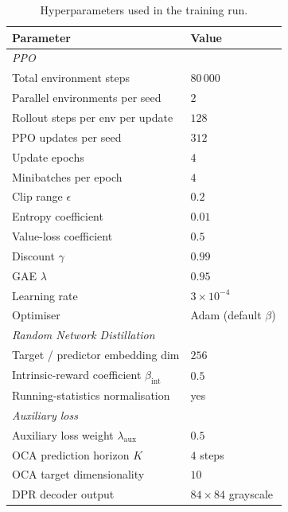 \documentclass{article}
\begin{document}
\begin{table}[h]
  \caption{Hyperparameters used in the training run.}
  \label{tab:hparams}
  \centering
  \small
  \begin{tabular}{ll}
    \toprule
    \textbf{Parameter} & \textbf{Value} \\
    \midrule
    \multicolumn{2}{l}{\emph{PPO}} \\
    Total environment steps                       & $80\,000$ \\
    Parallel environments per seed                & $2$ \\
    Rollout steps per env per update              & $128$ \\
    PPO updates per seed                          & $312$ \\
    Update epochs                                 & $4$ \\
    Minibatches per epoch                         & $4$ \\
    Clip range $\epsilon$                         & $0.2$ \\
    Entropy coefficient                           & $0.01$ \\
    Value-loss coefficient                        & $0.5$ \\
    Discount $\gamma$                             & $0.99$ \\
    GAE $\lambda$                                 & $0.95$ \\
    Learning rate                                 & $3 \times 10^{-4}$ \\
    Optimiser                                     & Adam (default $\beta$) \\
    \midrule
    \multicolumn{2}{l}{\emph{Random Network Distillation}} \\
    Target / predictor embedding dim              & $256$ \\
    Intrinsic-reward coefficient $\beta_\text{int}$ & $0.5$ \\
    Running-statistics normalisation              & yes \\
    \midrule
    \multicolumn{2}{l}{\emph{Auxiliary loss}} \\
    Auxiliary loss weight $\lambda_\text{aux}$    & $0.5$ \\
    OCA prediction horizon $K$                    & $4$ steps \\
    OCA target dimensionality                     & $10$ \\
    DPR decoder output                            & $84 \times 84$ grayscale \\

\end{tabular}
\end{table}
\end{document}
